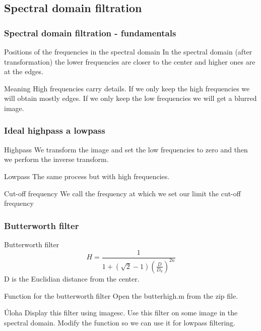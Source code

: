 \documentclass{beamer}
\begin{document}
\subsection{Spectral domain filtration}

\begin{frame}
\frametitle{Spectral domain filtration - fundamentals}
  \begin{block}{Positions of the frequencies in the spectral domain}
    In the spectral domain (after transformation) the lower frequencies are closer to the center and higher ones are at the edges.
  \end{block}
  
  \begin{block}{Meaning}
    High frequencies carry details. If we only keep the high frequencies we will obtain mostly edges. If we only keep the low frequencies we will get a blurred image.
  \end{block}
\end{frame}

\begin{frame}
\frametitle{Ideal highpass a lowpass}
  \begin{block}{Highpass}
    We transform the image and set the low frequencies to zero and then we perform the inverse transform.
  \end{block}
  
  \begin{block}{Lowpass}
    The same process but with high frequencies.
  \end{block}
  
  \begin{block}{Cut-off frequency}
    We call the frequency at which we set our limit the cut-off frequency
  \end{block}
\end{frame}

\begin{frame}[fragile]
\frametitle{Butterworth filter}
  \begin{block}{Butterworth filter}
  \begin{equation*}
    H = \frac{1}{1+\left(\sqrt{2} - 1\right) \left(\frac{D}{D_0}\right)^{2n}}
  \end{equation*}
  D is the Euclidian distance from the center.
  \end{block}

  \begin{block}{Function for the butterworth filter}
    Open the butterhigh.m from the zip file.
  \end{block}
  
  \begin{block}{Úloha}
    Display this filter using imagesc. Use this filter on some image in the spectral domain. Modify the function so we can use it for lowpass filtering.
  \end{block}    
\end{frame}
\end{document}
